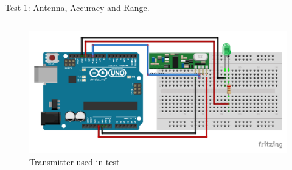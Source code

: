 \begin{frame}{Test 1: Antenna, Accuracy and Range.}
\begin{minipage}[0.3\textheight]{\textwidth}
\begin{columns}[T]
            \begin{column}{0.6\textwidth}
                \hspace{10 pt}
                \begin{figure}
                    \includegraphics[height=0.35\textheight,keepaspectratio]{figures/reciver_diagram.pdf}
                    \caption*{Transmitter used in test}
                \end{figure}
            \end{column}
        \end{columns}
    \end{minipage}

\end{frame}

